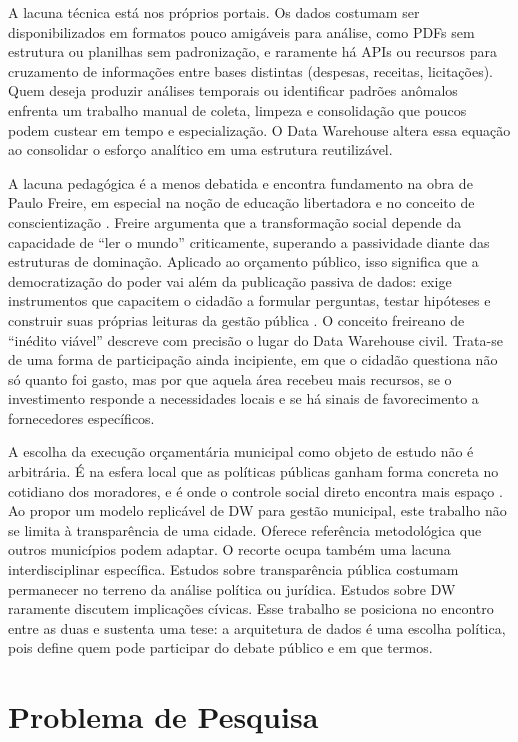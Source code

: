 A lacuna técnica está nos próprios portais. Os dados costumam ser disponibilizados em formatos pouco amigáveis para análise, como PDFs sem estrutura ou planilhas sem padronização, e raramente há APIs ou recursos para cruzamento de informações entre bases distintas (despesas, receitas, licitações). Quem deseja produzir análises temporais ou identificar padrões anômalos enfrenta um trabalho manual de coleta, limpeza e consolidação que poucos podem custear em tempo e especialização. O Data Warehouse altera essa equação ao consolidar o esforço analítico em uma estrutura reutilizável.

A lacuna pedagógica é a menos debatida e encontra fundamento na obra de Paulo Freire, em especial na noção de educação libertadora e no conceito de conscientização \cite{freire1967liberdade}. Freire argumenta que a transformação social depende da capacidade de ``ler o mundo'' criticamente, superando a passividade diante das estruturas de dominação. Aplicado ao orçamento público, isso significa que a democratização do poder vai além da publicação passiva de dados: exige instrumentos que capacitem o cidadão a formular perguntas, testar hipóteses e construir suas próprias leituras da gestão pública \cite{freire1996autonomia}. O conceito freireano de ``inédito viável'' descreve com precisão o lugar do Data Warehouse civil. Trata-se de uma forma de participação ainda incipiente, em que o cidadão questiona não só quanto foi gasto, mas por que aquela área recebeu mais recursos, se o investimento responde a necessidades locais e se há sinais de favorecimento a fornecedores específicos.

A escolha da execução orçamentária municipal como objeto de estudo não é arbitrária. É na esfera local que as políticas públicas ganham forma concreta no cotidiano dos moradores, e é onde o controle social direto encontra mais espaço \cite{novaes2014orcamento}. Ao propor um modelo replicável de DW para gestão municipal, este trabalho não se limita à transparência de uma cidade. Oferece referência metodológica que outros municípios podem adaptar. O recorte ocupa também uma lacuna interdisciplinar específica. Estudos sobre transparência pública costumam permanecer no terreno da análise política ou jurídica. Estudos sobre DW raramente discutem implicações cívicas. Esse trabalho se posiciona no encontro entre as duas e sustenta uma tese: a arquitetura de dados é uma escolha política, pois define quem pode participar do debate público e em que termos.

\section{Problema de Pesquisa}


